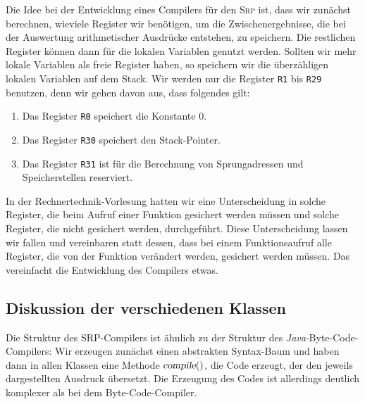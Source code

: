 Die Idee bei der Entwicklung eines Compilers f\"ur den \textsc{Srp} ist, dass wir zun\"achst
berechnen, wieviele Register wir ben\"otigen, um die 
Zwischenergebnisse, die bei der Auswertung arithmetischer Ausdr\"ucke entstehen, zu
speichern.  Die restlichen Register k\"onnen dann f\"ur die lokalen Variablen genutzt werden.
Sollten wir mehr lokale Variablen als freie Register haben, so speichern wir die
\"uberz\"ahligen lokalen Variablen auf dem Stack.
Wir werden nur die Register \texttt{R1} bis \texttt{R29} benutzen, denn  wir gehen davon 
aus,  dass folgendes gilt:
\begin{enumerate}
\item Das Register \texttt{R0}  speichert die Konstante $0$.
\item Das Register \texttt{R30} speichert den Stack-Pointer.
\item Das Register \texttt{R31} ist f\"ur die Berechnung von Sprungadressen und
      Speicherstellen reserviert.  
\end{enumerate}
In der Rechnertechnik-Vorlesung hatten wir eine Unterscheidung in solche
Register, die beim Aufruf einer Funktion gesichert werden m\"ussen und solche Register, die
nicht gesichert werden, durchgef\"uhrt.  Diese Unterscheidung lassen wir fallen und
vereinbaren statt dessen, dass bei einem Funktionsaufruf alle Register, die von der
Funktion ver\"andert werden, gesichert werden m\"ussen.  
Das vereinfacht die Entwicklung des Compilers etwas.

\subsection{Diskussion der verschiedenen Klassen}
Die Struktur des \textsc{SRP}-Compilers ist \"ahnlich zu der Struktur des
\textsl{Java}-Byte-Code-Compilers:  Wir erzeugen zun\"achst einen abstrakten Syntax-Baum und
haben dann in allen Klassen eine Methode $\textsl{compile}()$, die Code erzeugt, der den jeweils
dargestellten Ausdruck \"ubersetzt.  Die Erzeugung des Codes ist allerdings deutlich
komplexer als bei dem Byte-Code-Compiler.



